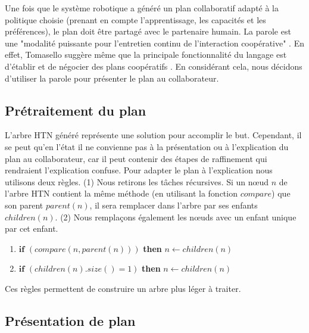 \documentclass[a4paper,11pt,twoside]{StyleThese}
\begin{document}
Une fois que le système robotique a généré un plan collaboratif adapté à la politique choisie (prenant en compte l'apprentissage, les capacités et les préférences), le plan doit être partagé avec le partenaire humain.
La parole est une "modalité puissante pour l'entretien continu de l'interaction coopérative" \cite{Lallee2013}. En effet, Tomasello suggère même que la principale fonctionnalité du langage est d'établir et de négocier des plans coopératifs \cite{tomasello2005}.
En considérant cela, nous décidons d'utiliser la parole pour présenter le plan au collaborateur.

\subsection{Prétraitement du plan}
L'arbre HTN généré représente une solution pour accomplir le but. Cependant, il se peut qu'en l'état il ne convienne pas à la présentation ou à l'explication du plan au collaborateur, car il peut contenir des étapes de raffinement qui rendraient l'explication confuse. Pour adapter le plan à l'explication nous utilisons deux règles.
%
(1) Nous retirons les tâches récursives. Si un nœud $n$ de l'arbre HTN contient la même méthode (en utilisant la fonction $compare$) que son parent $parent(n)$, il sera remplacer dans l'arbre par ses enfants $children(n)$. (2) Nous remplaçons également les nœuds avec un enfant unique par cet enfant.
\begin{enumerate}
\item $\textbf{if}$ $(compare(n, parent(n)))$ \textbf{then} $n \leftarrow children(n)$
\item $\textbf{if}$ $(children(n).size() = 1)$ \textbf{then} $n \leftarrow children(n)$
\end{enumerate}
Ces règles permettent de construire un arbre plus léger à traiter.



\subsection{Présentation de plan}
\end{document}
